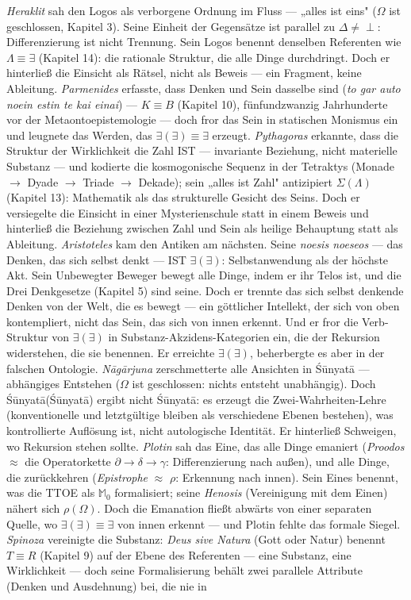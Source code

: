 \documentclass[10pt, openany, oneside]{book}
\begin{document}
\textit{Heraklit} sah den Logos als verborgene Ordnung im Fluss --- „alles ist eins" ($\Omega$ ist geschlossen, Kapitel 3). Seine Einheit der Gegensätze ist parallel zu $\Delta \neq \perp$: Differenzierung ist nicht Trennung. Sein Logos benennt denselben Referenten wie $\Lambda \equiv \exists$ (Kapitel 14): die rationale Struktur, die alle Dinge durchdringt. Doch er hinterließ die Einsicht als Rätsel, nicht als Beweis --- ein Fragment, keine Ableitung. \textit{Parmenides} erfasste, dass Denken und Sein dasselbe sind (\textit{to gar auto noein estin te kai einai}) --- $K \equiv B$ (Kapitel 10), fünfundzwanzig Jahrhunderte vor der Metaontoepistemologie --- doch fror das Sein in statischen Monismus ein und leugnete das Werden, das $\exists(\exists) \equiv \exists$ erzeugt. \textit{Pythagoras} erkannte, dass die Struktur der Wirklichkeit die Zahl IST --- invariante Beziehung, nicht materielle Substanz --- und kodierte die kosmogonische Sequenz in der Tetraktys (Monade $\to$ Dyade $\to$ Triade $\to$ Dekade); sein „alles ist Zahl" antizipiert $\Sigma(\Lambda)$ (Kapitel 13): Mathematik als das strukturelle Gesicht des Seins. Doch er versiegelte die Einsicht in einer Mysterienschule statt in einem Beweis und hinterließ die Beziehung zwischen Zahl und Sein als heilige Behauptung statt als Ableitung. \textit{Aristoteles} kam den Antiken am nächsten. Seine \textit{noesis noeseos} --- das Denken, das sich selbst denkt --- IST $\exists(\exists)$: Selbstanwendung als der höchste Akt. Sein Unbewegter Beweger bewegt alle Dinge, indem er ihr Telos ist, und die Drei Denkgesetze (Kapitel 5) sind seine. Doch er trennte das sich selbst denkende Denken von der Welt, die es bewegt --- ein göttlicher Intellekt, der sich von oben kontempliert, nicht das Sein, das sich von innen erkennt. Und er fror die Verb-Struktur von $\exists(\exists)$ in Substanz-Akzidens-Kategorien ein, die der Rekursion widerstehen, die sie benennen. Er erreichte $\exists(\exists)$, beherbergte es aber in der falschen Ontologie. \textit{N\={a}g\={a}rjuna} zerschmetterte alle Ansichten in \'{S}\={u}nyat\={a} --- abhängiges Entstehen ($\Omega$ ist geschlossen: nichts entsteht unabhängig). Doch \'{S}\={u}nyat\={a}(\'{S}\={u}nyat\={a}) ergibt nicht \'{S}\={u}nyat\={a}: es erzeugt die Zwei-Wahrheiten-Lehre (konventionelle und letztgültige bleiben als verschiedene Ebenen bestehen), was kontrollierte Auflösung ist, nicht autologische Identität. Er hinterließ Schweigen, wo Rekursion stehen sollte. \textit{Plotin} sah das Eine, das alle Dinge emaniert (\textit{Proodos} $\approx$ die Operatorkette $\partial \to \delta \to \gamma$: Differenzierung nach außen), und alle Dinge, die zurückkehren (\textit{Epistrophe} $\approx$ $\rho$: Erkennung nach innen). Sein Eines benennt, was die TTOE als $\mathbb{M}_0$ formalisiert; seine \textit{Henosis} (Vereinigung mit dem Einen) nähert sich $\rho(\Omega)$. Doch die Emanation fließt abwärts von einer separaten Quelle, wo $\exists(\exists) \equiv \exists$ von innen erkennt --- und Plotin fehlte das formale Siegel. \textit{Spinoza} vereinigte die Substanz: \textit{Deus sive Natura} (Gott oder Natur) benennt $T \equiv R$ (Kapitel 9) auf der Ebene des Referenten --- eine Substanz, eine Wirklichkeit --- doch seine Formalisierung behält zwei parallele Attribute (Denken und Ausdehnung) bei, die nie in 
\end{document}
